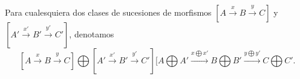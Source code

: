 \documentclass[preview]{standalone}
\begin{document}
\begin{center}
Para cualesquiera dos clases de sucesiones de morfismos $[A\xrightarrow{x}B\xrightarrow{y}C]$ y $[A'\xrightarrow{x'}B'\xrightarrow{y'}C']$, denotamos $$[A\xrightarrow{x}B\xrightarrow{y}C]\bigoplus[A'\xrightarrow{x'}B'\xrightarrow{y'}C'] \bigg[A\bigoplus A' \xrightarrow{x\bigoplus x'} B\bigoplus B' \xrightarrow{y\bigoplus y'} C\bigoplus C'.$$
\end{center}
\end{document}
